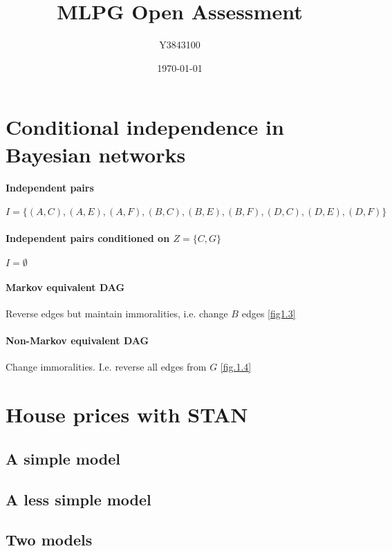 \documentclass[11pt,a4paper]{article}
\title{MLPG Open Assessment}
\author{Y3843100}
\date{\today}
\begin{document}
\maketitle


\section{Conditional independence in Bayesian networks}

\paragraph{Independent pairs}
\(I = \{(A,C),(A,E),(A,F),(B,C),(B,E),(B,F),(D,C),(D,E),(D,F)\}\)

\paragraph{Independent pairs conditioned on \(Z = \{C,G\}\)}
\(I = \emptyset\)

\paragraph{Markov equivalent DAG}
Reverse edges but maintain immoralities, i.e. change \(B\) edges \ref{fig1.3}

\paragraph{Non-Markov equivalent DAG}
Change immoralities. I.e. reverse all edges from \(G\) \ref{fig.1.4}

\section{House prices with STAN}

  \subsection{A simple model}

  \subsection{A less simple model}

  \subsection{Two models}
\end{document}
